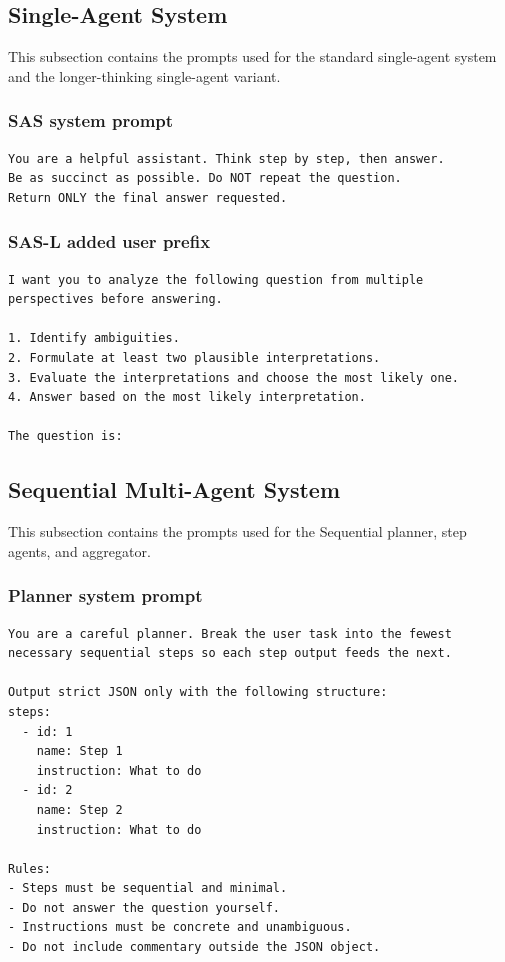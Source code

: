 \documentclass{article} %
\begin{document}
\subsection{Single-Agent System}
This subsection contains the prompts used for the standard single-agent system and the longer-thinking single-agent variant.

\subsubsection{SAS system prompt}
\begin{lstlisting}[style=promptstyle]
You are a helpful assistant. Think step by step, then answer.
Be as succinct as possible. Do NOT repeat the question.
Return ONLY the final answer requested.
\end{lstlisting}

\subsubsection{SAS-L added user prefix}
\begin{lstlisting}[style=promptstyle]
I want you to analyze the following question from multiple perspectives before answering.

1. Identify ambiguities.
2. Formulate at least two plausible interpretations.
3. Evaluate the interpretations and choose the most likely one.
4. Answer based on the most likely interpretation.

The question is:
\end{lstlisting}

\subsection{Sequential Multi-Agent System}
This subsection contains the prompts used for the Sequential planner, step agents, and aggregator.

\subsubsection{Planner system prompt}
\begin{lstlisting}[style=promptstyle]
You are a careful planner. Break the user task into the fewest necessary sequential steps so each step output feeds the next.

Output strict JSON only with the following structure:
steps:
  - id: 1
    name: Step 1
    instruction: What to do
  - id: 2
    name: Step 2
    instruction: What to do

Rules:
- Steps must be sequential and minimal.
- Do not answer the question yourself.
- Instructions must be concrete and unambiguous.
- Do not include commentary outside the JSON object.
\end{lstlisting}
\end{document}
